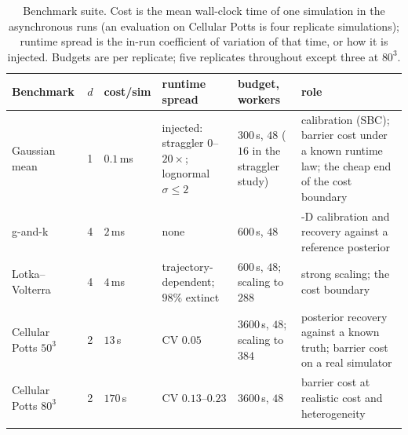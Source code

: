 \documentclass[pdflatex,sn-mathphys-num]{sn-jnl}
\theoremstyle{plain}
\theoremstyle{definition}
\begin{document}
\begin{table}[t]
\caption{Benchmark suite. Cost is the mean wall-clock time of one simulation in the asynchronous runs (an evaluation on Cellular Potts is four replicate simulations); runtime spread is the in-run coefficient of variation of that time, or how it is injected. Budgets are per replicate; five replicates throughout except three at $80^3$.}\label{tab:benchmarks}
\centering
\footnotesize
\setlength{\tabcolsep}{3pt}
\begin{tabular}{@{}>{\raggedright\arraybackslash}p{}c>{\raggedright\arraybackslash}p{}>{\raggedright\arraybackslash}p{}>{\raggedright\arraybackslash}p{}>{\raggedright\arraybackslash}p{}@{}}
\toprule
Benchmark & $d$ & cost/sim & runtime spread & budget, workers & role \\
\midrule
Gaussian mean & 1 & $0.1$\,ms & injected: straggler $0$--$20\times$; lognormal $\sigma\le2$ & $300$\,s, $48$ ($16$ in the straggler study) & calibration (SBC); barrier cost under a known runtime law; the cheap end of the cost boundary \\
g-and-k & 4 & $2$\,ms & none & $600$\,s, $48$ & 4-D calibration and recovery against a reference posterior \\
Lotka--Volterra & 4 & $4$\,ms & trajectory-dependent; $98\%$ extinct & $600$\,s, $48$; scaling to $288$ & strong scaling; the cost boundary \\
Cellular Potts $50^3$ & 2 & $13$\,s & CV $0.05$ & $3600$\,s, $48$; scaling to $384$ & posterior recovery against a known truth; barrier cost on a real simulator \\
Cellular Potts $80^3$ & 2 & $170$\,s & CV $0.13$--$0.23$ & $3600$\,s, $48$ & barrier cost at realistic cost and heterogeneity \\
\botrule
\end{tabular}
\end{table}
\end{document}
